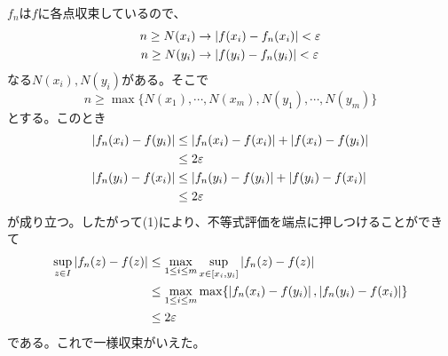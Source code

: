 \begin{sol}
\begin{description}
$f_n$は$f$に各点収束しているので、
\begin{align*}
  n \geq N(x_i) &\to \left \lvert f(x_i) - f_n(x_i) \right \rvert < {\varepsilon} \\
  n \geq N(y_i) &\to \left \lvert f(y_i) - f_n(y_i) \right \rvert < {\varepsilon}
\end{align*}
なる$N(x_i), N(y_i)$がある。そこで
\[
n \geq \max\{ N(x_1), \cdots , N(x_m) , N(y_1) , \cdots , N(y_m)  \}
\]
とする。このとき
\begin{align*}
  \left \lvert f_n(x_i)- f(y_i)  \right \rvert &\leq \left \lvert  f_n(x_i) - f(x_i)  \right \rvert + \left \lvert  f(x_i) - f(y_i)  \right \rvert \\
  &\leq 2{\varepsilon} \\
\left \lvert f_n(y_i)- f(x_i)  \right \rvert  &\leq \left \lvert  f_n(y_i) - f(y_i)  \right \rvert + \left \lvert  f(y_i) - f(x_i)  \right \rvert \\
&\leq 2{\varepsilon}
\end{align*}
が成り立つ。したがって(1)により、不等式評価を端点に押しつけることができて
\begin{align*}
\sup_{z \in I } \left \lvert f_n(z) - f(z) \right \rvert &\leq \max_{1 \leq i \leq m} \sup_{x \in [x_i,y_i]} \left \lvert f_n(z) - f(z) \right \rvert \\
&\leq \max_{1 \leq i \leq m} \max\{ \left \lvert f_n(x_i)- f(y_i) \right \rvert, \left \lvert f_n(y_i)-f(x_i) \right \rvert  \} \\
&\leq 2{\varepsilon}
\end{align*}
である。これで一様収束がいえた。
\end{description}
\end{sol}

\newpage

